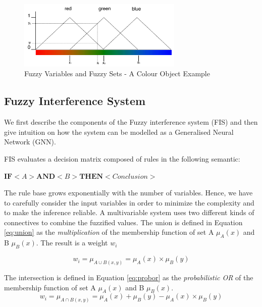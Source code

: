 \begin{figure}[H]
        \centering
         \includegraphics[width=0.7\textwidth ]{img/model/fuzz_example}
              
        \caption{Fuzzy Variables and Fuzzy Sets - A Colour Object Example}
        \label{fig:fuzz_example}
\end{figure}



\subsection{Fuzzy Interference System}

We first describe the components of the Fuzzy interference system (FIS) and then give intuition on how the system can be modelled as a Generalised Neural Network (GNN). 

FIS evaluates a decision matrix composed of rules in the following semantic: \\

\centerline {$ \textbf{IF} <  A  > \textbf{AND} <  B  > \textbf{THEN} < Conclusion > $}

The rule base grows exponentially with the number of variables. Hence, we have to carefully consider the input variables in order to minimize the complexity and to make the inference reliable. A multivariable system uses two different kinds of connectives to combine the fuzzified values. The union is defined in Equation \ref{eq:union} as the \emph{multiplication} of the membership function of set A $\mu_A(x)$ and B $\mu_B(x).$ The result is a weight $w_i$


 \begin{equation} \label{eq:union}
 w_i =  \mu_{A\cup B(x,y)} =   \mu_A (x) \times \mu_B(y)
 \end{equation}

The intersection is defined in Equation \ref{eq:probor} as the \emph{probabilistic OR} of the membership function of set A $\mu_A(x)$ and B $\mu_B(x).$ 
\begin{equation} \label{eq:probor}
 w_i =  \mu_{A\cap B(x,y)} =   \mu_A (x)  + \mu_B(y) -  \mu_A (x)  \times \mu_B(y)
 \end{equation}

